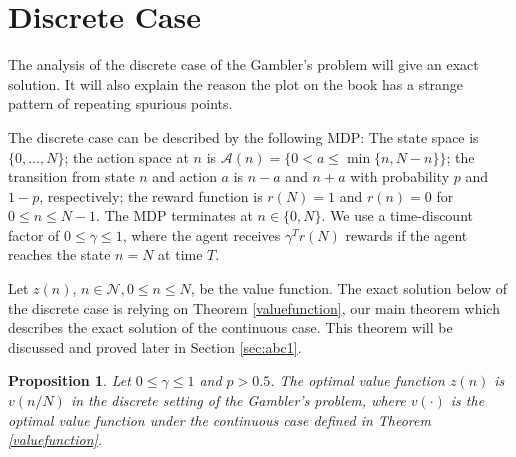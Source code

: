 \documentclass{article}
\newtheorem{proposition}[theorem]{Proposition}
\theoremstyle{named}
\newcommand{\cN}{\mathcal{N}}
\newcommand{\cA}{\mathcal{A}}
\begin{document}
\section{Discrete Case}

The analysis of the discrete case of the Gambler's problem will give an exact solution. It will also explain the reason the plot on the book has a strange pattern of repeating spurious points.

The discrete case can be described by the following MDP: The state space is $\{0, \dots, N\}$; the action space at $n$ is $\cA(n)=\{0<a\leq\min\{n, N-n\}\}$; the transition from state $n$ and action $a$ is $n-a$ and $n+a$ with probability $p$ and $1-p$, respectively; the reward function is $r(N)=1$ and $r(n)=0$ for $0\leq n \leq N-1$. The MDP terminates at $n\in\{0,N\}$. We use a time-discount factor of $0\leq \gamma\leq 1$, where the agent receives $\gamma^Tr(N)$ rewards if the agent reaches the state $n=N$ at time $T$.

Let $z(n)$, $n\in\cN, 0\leq n\leq N$, be the value function. The exact solution below of the discrete case is relying on Theorem \ref{valuefunction}, our main theorem which describes the exact solution of the continuous case. This theorem will be discussed and proved later in Section \ref{sec:abc1}.

\begin{proposition}
\label{discretevaluefunction}
Let $0\leq\gamma\leq 1$ and $p>0.5$. The optimal value function $z(n)$ is $v(n/N)$ in the discrete setting of the Gambler's problem, where $v(\cdot)$ is the optimal value function under the continuous case defined in Theorem \ref{valuefunction}.
\end{proposition}
\end{document}
